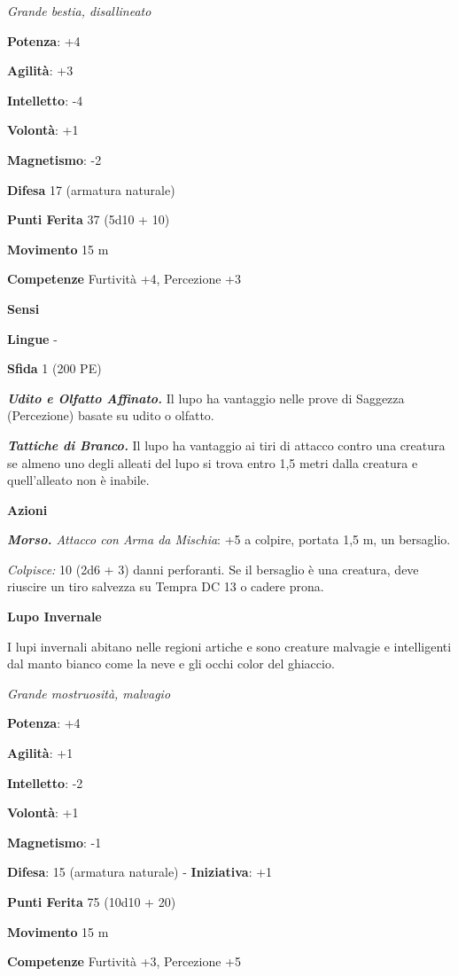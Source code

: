 \begin{multicols}{2}
\emph{Grande bestia, disallineato}

\textbf{Potenza}: +4

\textbf{Agilità}: +3

\textbf{Intelletto}: -4

\textbf{Volontà}: +1

\textbf{Magnetismo}: -2

\textbf{Difesa} 17 (armatura naturale)

\textbf{Punti Ferita} 37 (5d10 + 10)

\textbf{Movimento} 15 m

\textbf{Competenze} Furtività +4, Percezione +3

\textbf{Sensi} 

\textbf{Lingue} -

\textbf{Sfida} 1 (200 PE)

\emph{\textbf{Udito e Olfatto Affinato.}} Il lupo ha vantaggio nelle
prove di Saggezza (Percezione) basate su udito o olfatto.

\emph{\textbf{Tattiche di Branco.}} Il lupo ha vantaggio ai tiri di
attacco contro una creatura se almeno uno degli alleati del lupo si
trova entro 1,5 metri dalla creatura e quell'alleato non è inabile.

\textbf{Azioni}

\emph{\textbf{Morso.} Attacco con Arma da Mischia}: +5 a colpire,
portata 1,5 m, un bersaglio.

\emph{Colpisce:} 10 (2d6 + 3) danni perforanti. Se il bersaglio è una
creatura, deve riuscire un tiro salvezza su Tempra DC 13 o cadere prona.

\textbf{Lupo Invernale}

I lupi invernali abitano nelle regioni artiche e sono creature malvagie
e intelligenti dal manto bianco come la neve e gli occhi color del
ghiaccio.

\emph{Grande mostruosità, malvagio}

\textbf{Potenza}: +4

\textbf{Agilità}: +1

\textbf{Intelletto}: -2

\textbf{Volontà}: +1

\textbf{Magnetismo}: -1

\textbf{Difesa}: 15 (armatura naturale) - \textbf{Iniziativa}: +1

\textbf{Punti Ferita} 75 (10d10 + 20)

\textbf{Movimento} 15 m

\textbf{Competenze} Furtività +3, Percezione +5


\end{multicols}
